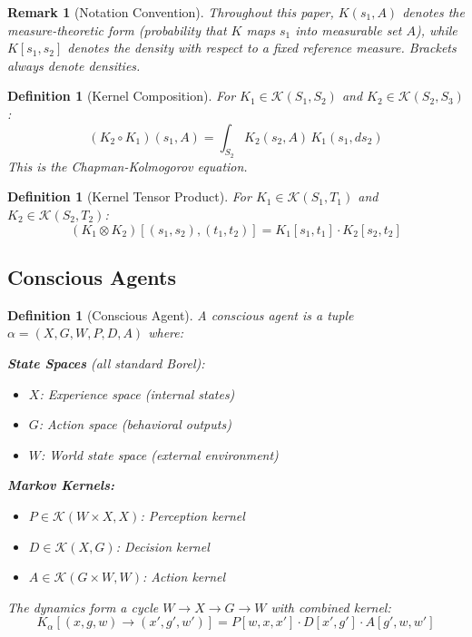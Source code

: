 \documentclass[11pt,a4paper]{article}
\newtheorem{definition}[theorem]{Definition}
\newtheorem*{remark}{Remark}
\newcommand{\Kern}{\mathcal{K}}
\begin{document}
\begin{remark}[Notation Convention]
Throughout this paper, $K(s_1, A)$ denotes the measure-theoretic form (probability that $K$ maps $s_1$ into measurable set $A$), while $K[s_1, s_2]$ denotes the density with respect to a fixed reference measure. Brackets always denote densities.
\end{remark}

\begin{definition}[Kernel Composition]\label{def:kernel-comp}
For $K_1 \in \Kern(S_1, S_2)$ and $K_2 \in \Kern(S_2, S_3)$:
\[
(K_2 \circ K_1)(s_1, A) = \int_{S_2} K_2(s_2, A) \, K_1(s_1, ds_2)
\]
This is the Chapman-Kolmogorov equation.
\end{definition}

\begin{definition}[Kernel Tensor Product]\label{def:kernel-tensor}
For $K_1 \in \Kern(S_1, T_1)$ and $K_2 \in \Kern(S_2, T_2)$:
\[
(K_1 \otimes K_2)[(s_1, s_2), (t_1, t_2)] = K_1[s_1, t_1] \cdot K_2[s_2, t_2]
\]
\end{definition}

\subsection{Conscious Agents}

\begin{definition}[Conscious Agent]\label{def:agent}
A \emph{conscious agent} is a tuple $\alpha = (X, G, W, P, D, A)$ where:

\textbf{State Spaces} (all standard Borel):
\begin{itemize}[nosep]
    \item $X$: Experience space (internal states)
    \item $G$: Action space (behavioral outputs)
    \item $W$: World state space (external environment)
\end{itemize}

\textbf{Markov Kernels:}
\begin{itemize}[nosep]
    \item $P \in \Kern(W \times X, X)$: Perception kernel
    \item $D \in \Kern(X, G)$: Decision kernel
    \item $A \in \Kern(G \times W, W)$: Action kernel
\end{itemize}

The dynamics form a cycle $W \to X \to G \to W$ with combined kernel:
\begin{equation}\label{eq:dynamics}
K_\alpha[(x, g, w) \to (x', g', w')] = P[w, x, x'] \cdot D[x', g'] \cdot A[g', w, w']
\end{equation}
\end{definition}
\end{document}
